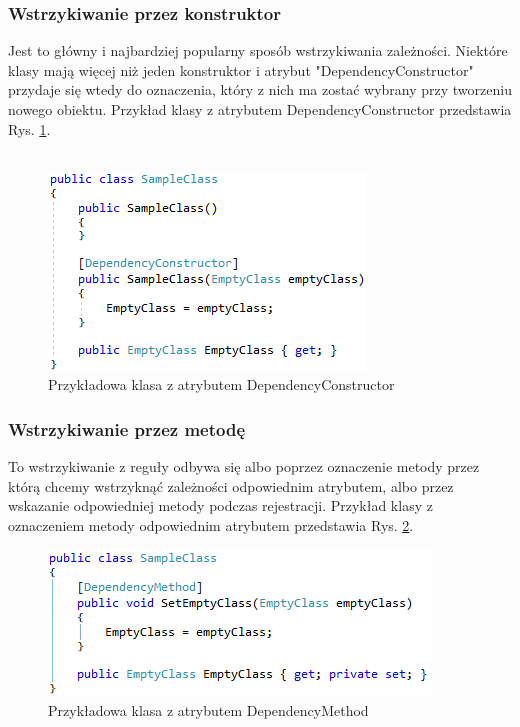 \documentclass[12pt]{article}
\begin{document}
\subsubsection{Wstrzykiwanie przez konstruktor}
Jest to główny i najbardziej popularny sposób wstrzykiwania zależności. Niektóre klasy mają więcej niż jeden konstruktor i atrybut "DependencyConstructor" przydaje się wtedy do oznaczenia, który z nich ma zostać wybrany przy tworzeniu nowego obiektu. Przykład klasy z atrybutem DependencyConstructor przedstawia Rys. \ref{fig:DependencyConstructor}.\\ \\
\begin{figure}[H]
	\begin{center}
  		\includegraphics{DependencyConstructor.png}
  		\caption{Przykładowa klasa z atrybutem DependencyConstructor}
  		\label{fig:DependencyConstructor}
	\end{center}
\end{figure}

\subsubsection{Wstrzykiwanie przez metodę}
To wstrzykiwanie z reguły odbywa się albo poprzez oznaczenie metody przez którą chcemy wstrzyknąć zależności odpowiednim atrybutem, albo przez wskazanie odpowiedniej metody podczas rejestracji. Przykład klasy z oznaczeniem metody odpowiednim atrybutem przedstawia Rys. \ref{fig:DependencyMethod}.
\begin{figure}[H]
	\begin{center}
  		\includegraphics{DependencyMethod.png}
  		\caption{Przykładowa klasa z atrybutem DependencyMethod}
  		\label{fig:DependencyMethod}
	\end{center}
\end{figure}
\end{document}
